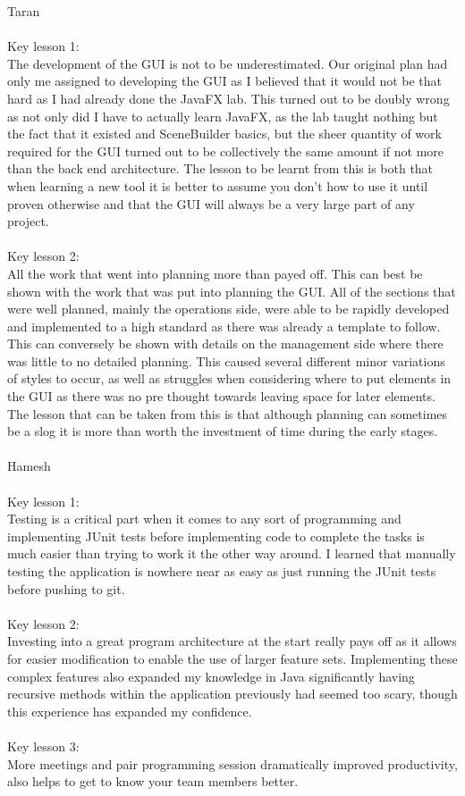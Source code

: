 Taran \\ \\
Key lesson 1: \\
The development of the GUI is not to be underestimated. Our original plan had only me assigned to developing the GUI as I believed that it would not be that hard as I had already done the JavaFX lab. This turned out to be doubly wrong as not only did I have to actually learn JavaFX, as the lab taught nothing but the fact that it existed and SceneBuilder basics, but the sheer quantity of work required for the GUI turned out to be collectively the same amount if not more than the back end architecture.
The lesson to be learnt from this is both that when learning a new tool it is better to assume you don't how to use it until proven otherwise and that the GUI will always be a very large part of any project.
\\ \\
Key lesson 2: \\
All the work that went into planning more than payed off. This can best be shown with the work that was put into planning the GUI. All of the sections that were well planned, mainly the operations side, were able to be rapidly developed and implemented to a high standard as there was already a template to follow. This can conversely be shown with details on the management side where there was little to no detailed planning. This caused several different minor variations of styles to occur, as well as struggles when considering where to put elements in the GUI as there was no pre thought towards leaving space for later elements.
The lesson that can be taken from this is that although planning can sometimes be a slog it is  more than worth the investment of time during the early stages.
\\ \\
\noindent Hamesh \\ \\
\noindent Key lesson 1: \\
\noindent Testing is a critical part when it comes to any sort of programming and implementing JUnit tests before implementing code to complete the tasks is much easier than trying to work it the other way around. I learned that manually testing the application is nowhere near as easy as just running the JUnit tests before pushing to git.
\\ \\
Key lesson 2: \\
Investing into a great program architecture at the start really pays off as it allows for easier modification to enable the use of larger feature sets. Implementing these complex features also expanded my knowledge in Java significantly having recursive methods within the application previously had seemed too scary, though this experience has expanded my confidence.
\\ \\
Key lesson 3: \\
More meetings and pair programming session dramatically improved productivity, also helps to get to know your team members better. 